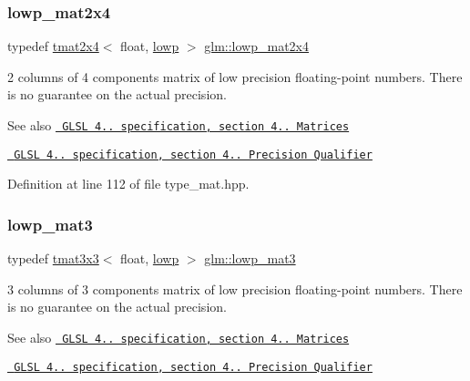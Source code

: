 \subsubsection{\texorpdfstring{lowp\_mat2x4}{lowp\_mat2x4}}
{\footnotesize\ttfamily typedef \mbox{\hyperlink{structglm_1_1tmat2x4}{tmat2x4}}$<$ float, \mbox{\hyperlink{namespaceglm_a0f04f086094c747d227af4425893f545ae161af3fc695e696ce3bf69f7332bc2d}{lowp}} $>$ \mbox{\hyperlink{group__core__precision_gafb9e8f974dd69b38b5acc16989882aa0}{glm\+::lowp\+\_\+mat2x4}}}

2 columns of 4 components matrix of low precision floating-\/point numbers. There is no guarantee on the actual precision.

\begin{DoxySeeAlso}{See also}
\href{http://www.opengl.org/registry/doc/GLSLangSpec.4.20.8.pdf}{\texttt{ G\+L\+SL 4.. specification, section 4.. Matrices}} 

\href{http://www.opengl.org/registry/doc/GLSLangSpec.4.20.8.pdf}{\texttt{ G\+L\+SL 4.. specification, section 4.. Precision Qualifier}} 
\end{DoxySeeAlso}


Definition at line 112 of file type\+\_\+mat.\+hpp.

\mbox{\label{group__core__precision_ga35fabe40e121bf764419b1d355cbbcd2}} 
\subsubsection{\texorpdfstring{lowp\_mat3}{lowp\_mat3}}
{\footnotesize\ttfamily typedef \mbox{\hyperlink{structglm_1_1tmat3x3}{tmat3x3}}$<$ float, \mbox{\hyperlink{namespaceglm_a0f04f086094c747d227af4425893f545ae161af3fc695e696ce3bf69f7332bc2d}{lowp}} $>$ \mbox{\hyperlink{group__core__precision_ga35fabe40e121bf764419b1d355cbbcd2}{glm\+::lowp\+\_\+mat3}}}

3 columns of 3 components matrix of low precision floating-\/point numbers. There is no guarantee on the actual precision.

\begin{DoxySeeAlso}{See also}
\href{http://www.opengl.org/registry/doc/GLSLangSpec.4.20.8.pdf}{\texttt{ G\+L\+SL 4.. specification, section 4.. Matrices}} 

\href{http://www.opengl.org/registry/doc/GLSLangSpec.4.20.8.pdf}{\texttt{ G\+L\+SL 4.. specification, section 4.. Precision Qualifier}} 
\end{DoxySeeAlso}


